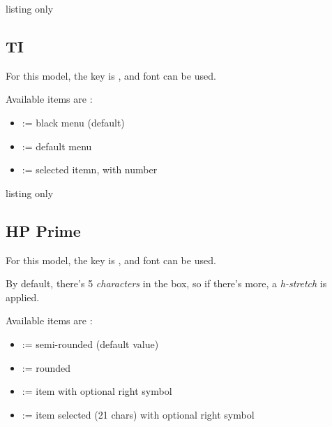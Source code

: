 \documentclass[11pt,a4paper]{ltxdoc}
\begin{document}
\begin{DemoCode}{listing only}
\end{DemoCode}

\subsection{TI}

For this model, the key is \ShowCode{[model=ti]}, and font \ShowCode{[font=\\fontTI]} can be used.

Available items are :

\begin{itemize}[leftmargin=*]
	\item \ShowCode{[type=\{\}]} := black menu (default)\hfill{}
	\item \ShowCode{[type=menu]} := default menu\hfill{}
	\item \ShowCode{[type=itemsel]} := selected itemn, with number\hfill{}
\end{itemize}

\begin{DemoCode}{listing only}
\end{DemoCode}

\subsection{HP Prime}

For this model, the key is \ShowCode{[model=hp]}, and font \ShowCode{[font=\\fontHP]} can be used.

By default, there's 5 \textit{characters} in the box, so if there's more, a \textit{h-stretch} is applied.

Available items are :

\begin{itemize}[leftmargin=*]
	\item \ShowCode{[type=\{\}]} := semi-rounded (default value) \hfill{}
	\item \ShowCode{[type=ritem]} := rounded \hfill{}
	\item \ShowCode{[type=item]} := item with optional right symbol\hfill{}
	\item \ShowCode{[type=itemsel]} := item selected (21 chars) with optional right symbol
	
	\hfill{}
\end{itemize}
\end{document}
